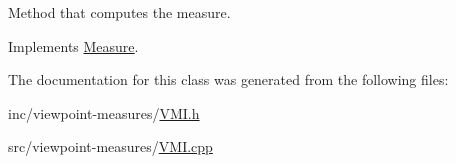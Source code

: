 Method that computes the measure. 



Implements \hyperlink{class_measure_aed88fe46b2a609ab5948e5f3c891321d}{Measure}.



The documentation for this class was generated from the following files\+:\begin{DoxyCompactItemize}
\item 
inc/viewpoint-\/measures/\hyperlink{_v_m_i_8h}{V\+M\+I.\+h}\item 
src/viewpoint-\/measures/\hyperlink{_v_m_i_8cpp}{V\+M\+I.\+cpp}\end{DoxyCompactItemize}
